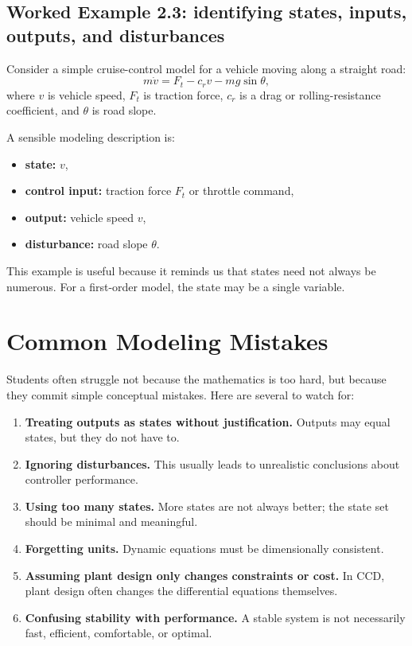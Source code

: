 \documentclass[11pt]{article}
\begin{document}
\subsection{Worked Example 2.3: identifying states, inputs, outputs, and disturbances}

Consider a simple cruise-control model for a vehicle moving along a straight road:
\begin{equation}
 m\dot{v}=F_t - c_r v - mg\sin\theta,
\end{equation}
where $v$ is vehicle speed, $F_t$ is traction force, $c_r$ is a drag or rolling-resistance coefficient, and $\theta$ is road slope.

A sensible modeling description is:
\begin{itemize}[leftmargin=1.4em]
  \item \textbf{state:} $v$,
  \item \textbf{control input:} traction force $F_t$ or throttle command,
  \item \textbf{output:} vehicle speed $v$,
  \item \textbf{disturbance:} road slope $\theta$.
\end{itemize}

This example is useful because it reminds us that states need not always be numerous. For a first-order model, the state may be a single variable.

\section{Common Modeling Mistakes}

Students often struggle not because the mathematics is too hard, but because they commit simple conceptual mistakes. Here are several to watch for:
\begin{enumerate}[leftmargin=1.5em]
  \item \textbf{Treating outputs as states without justification.} Outputs may equal states, but they do not have to.
  \item \textbf{Ignoring disturbances.} This usually leads to unrealistic conclusions about controller performance.
  \item \textbf{Using too many states.} More states are not always better; the state set should be minimal and meaningful.
  \item \textbf{Forgetting units.} Dynamic equations must be dimensionally consistent.
  \item \textbf{Assuming plant design only changes constraints or cost.} In CCD, plant design often changes the differential equations themselves.
  \item \textbf{Confusing stability with performance.} A stable system is not necessarily fast, efficient, comfortable, or optimal.
\end{enumerate}
\end{document}
